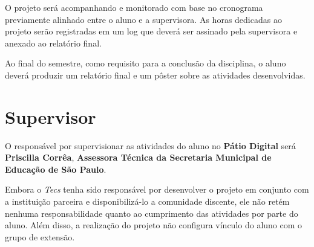 \documentclass{article}
\begin{document}
O projeto será acompanhando e monitorado com base no cronograma previamente alinhado entre o aluno e a supervisora. As horas dedicadas ao projeto serão registradas em um log que deverá ser assinado pela supervisora e anexado ao relatório final.

Ao final do semestre, como requisito para a conclusão da disciplina, o aluno deverá produzir um relatório final e um pôster sobre as atividades desenvolvidas.

\section{Supervisor}

O responsável por supervisionar as atividades do aluno  no \textbf{Pátio Digital} será \textbf{Priscilla Corrêa}, \textbf{Assessora Técnica da Secretaria Municipal de Educação de São Paulo}.

Embora o \textit{Tecs} tenha sido responsável por desenvolver o projeto em conjunto com a instituição parceira e disponibilizá-lo a comunidade discente, ele não retém nenhuma responsabilidade quanto ao cumprimento das atividades por parte do aluno. Além disso, a realização do projeto não configura vínculo do aluno com o grupo de extensão.
\end{document}
